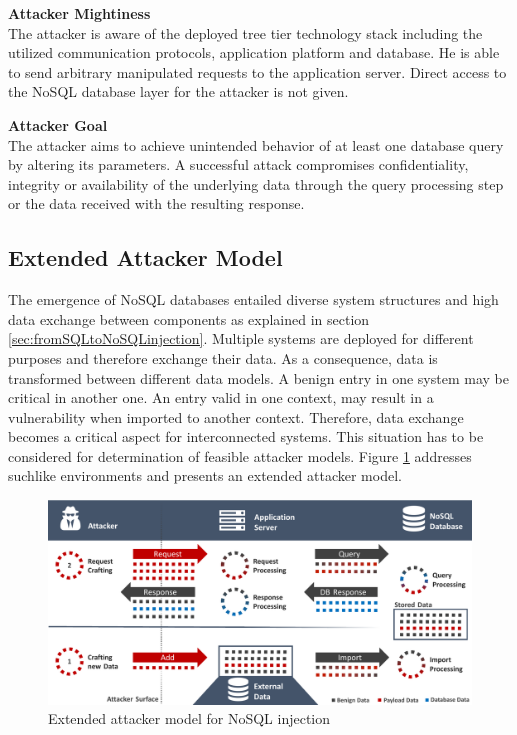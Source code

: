 \begin{minipage}[t]{0.48\textwidth}
  \textbf{Attacker Mightiness} \\ 
  The attacker is aware of the deployed tree tier technology stack including the utilized communication protocols, application platform and database. He is able to send arbitrary manipulated requests to the application server. Direct access to the NoSQL database layer for the attacker is not given.
\end{minipage}
\hfill
\begin{minipage}[t]{0.48\textwidth}
  \textbf{Attacker Goal} \\ 
  The attacker aims to achieve unintended behavior of at least one database query by altering its parameters. A successful attack compromises confidentiality, integrity or availability of the underlying data through the query processing step or the data received with the resulting response.
\end{minipage}

\subsection{Extended Attacker Model}

The emergence of NoSQL databases entailed diverse system structures and high data exchange between components as explained in section \ref{sec:fromSQLtoNoSQLinjection}. Multiple systems are deployed for different purposes and therefore exchange their data. As a consequence, data is transformed between different data models. A benign entry in one system may be critical in another one. An entry valid in one context, may result in a vulnerability when imported to another context. Therefore, data exchange becomes a critical aspect for interconnected systems. This situation has to be considered for determination of feasible attacker models. Figure \ref{fig:extendedAttackerModel} addresses suchlike environments and presents an extended attacker model. \\

\begin{figure}[h]
\centering
  \includegraphics[width=1\linewidth]{Images/attacker_model_extended}
  \caption{Extended attacker model for NoSQL injection}
  \label{fig:extendedAttackerModel}
\end{figure}

